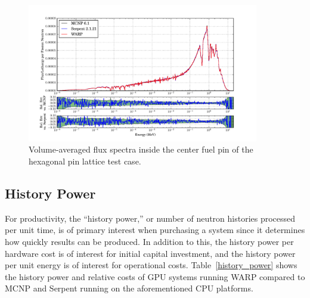 \documentclass[preprint,12pt]{elsarticle}
\begin{document}
\begin{figure}[!htbp]
\centering
\includegraphics[width=0.9\textwidth,trim= 1cm 0cm 1cm 0cm]{graphics/assembly-lw_spec.pdf}
\caption{Volume-averaged flux spectra inside the center fuel pin of the hexagonal pin lattice test case. \label{assembly-lw_spec} }
\end{figure}

\newpage
\subsection{History Power}

For productivity, the ``history power,'' or  number of neutron histories processed per unit time, is of primary interest when purchasing a system since it determines how quickly results can be produced.  In addition to this, the history power per hardware cost is of interest for initial capital investment, and the history power per unit energy is of interest for operational costs.  Table~\ref{history_power} shows the history power and relative costs of GPU systems running WARP compared to MCNP and Serpent running on the aforementioned CPU platforms.  
\end{document}
